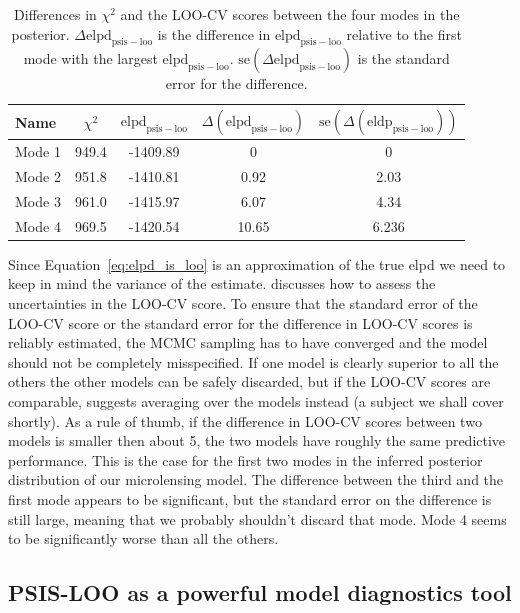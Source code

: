 \documentclass[12pt,dvipsnames]{report}
\begin{document}
\begin{table}[h!]
\centering
\begin{tabular}{l c c c c} 
 \toprule
Name & $\chi^2$ & $\mathrm{elpd}_\mathrm{psis-loo}$ & $\Delta(\mathrm{elpd}_\mathrm{psis-loo})$ & $\mathrm{se}(\Delta(\mathrm{eldp}_\mathrm{psis-loo}))$ \\
 \midrule
 Mode 1 & 949.4& -1409.89 & 0 & 0 \\
 Mode 2 & 951.8& -1410.81 & 0.92 & 2.03\\
 Mode 3 & 961.0& -1415.97 &  6.07 & 4.34\\
 Mode 4 & 969.5& -1420.54 &  10.65	& 6.236\\
\bottomrule
\end{tabular}
\caption{Differences in $\chi^2$ and the LOO-CV scores between the four modes in the 
posterior. $\Delta \mathrm{elpd}_\mathrm{psis-loo}$ is the difference in 
$\mathrm{elpd}_\mathrm{psis-loo}$ relative to the first mode with the largest 
$\mathrm{elpd}_\mathrm{psis-loo}$. $\mathrm{se}(\Delta \mathrm{elpd}_\mathrm{psis-loo})$
is the standard error for the difference.}
\label{tab:loo_cv}
\end{table}

Since Equation~\ref{eq:elpd_is_loo} is an approximation of the true elpd we need to 
keep in mind the variance of the estimate. \citet{arXiv:2008.10296} discusses how 
to assess the uncertainties in the LOO-CV score. To ensure that the standard 
error of the LOO-CV score or the standard error for the difference in LOO-CV scores is 
reliably estimated, the MCMC sampling has to have converged and the model should not be
completely misspecified. If one model is clearly superior to all the others 
the other models can be safely discarded, but if the LOO-CV scores are comparable,
\citet{arXiv:2008.10296} suggests averaging over the models instead (a subject we
shall cover shortly).
As a rule of thumb, if the difference in LOO-CV scores between two models is smaller 
then about 5, the two models have roughly the same predictive performance.
This is the case for the first two modes in the inferred posterior distribution of our 
microlensing model. The difference between the third 
and the first mode appears to be significant, but the standard error on the difference 
is still large, meaning that we probably shouldn't discard that mode.
Mode 4 seems to be significantly worse than all the others.


\subsection{PSIS-LOO as a powerful model diagnostics tool}
\end{document}
